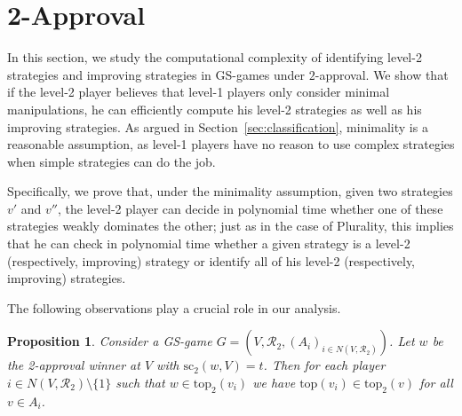 \documentclass[11pt]{article}
\newtheorem{proposition}{Proposition}
\newcommand{\calR}{\mathcal{R}}
\newcommand{\tp}{\mathrm{top}}
\newcommand{\scr}{\mathrm{sc}}
\begin{document}
\section{2-Approval}\label{sec:2app}
In this section, we study the computational complexity of identifying level-2 strategies 
and improving strategies in GS-games under $2$-approval. We show that if the level-2 player believes
that level-1 players only consider minimal manipulations, 
he can efficiently compute his level-2 strategies as well as his improving strategies. 
As argued in Section~\ref{sec:classification}, 
minimality is a reasonable assumption, as level-1 players have no reason to use complex
strategies when simple strategies can do the job.

Specifically, we prove that,  
under the minimality assumption, given two strategies $v'$ and $v''$, 
the level-2 player can decide in polynomial time whether one of these strategies weakly dominates the other;
just as in the case of Plurality, this implies that he 
can check in polynomial time whether
a given strategy is a level-2 (respectively, improving) strategy or identify all of his level-2 
(respectively, improving) strategies.

The following observations play a crucial role in our analysis.

\begin{proposition}\label{prop:2app-demote}
Consider a GS-game $G=(V, \calR_2, (A_i)_{i\in N(V, \calR_2)})$.
Let $w$ be the 2-approval winner at $V$ with $\scr_2(w, V)=t$.
Then for each player $i\in N(V, \calR_2)\setminus\{1\}$
such that $w\in\tp_2(v_i)$ we have $\tp(v_i)\in \tp_2(v)$ for all $v\in A_i$.
\end{proposition}
\end{document}
